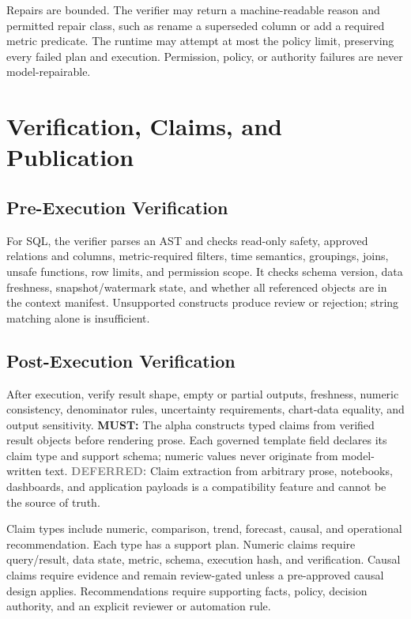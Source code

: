 \documentclass[10pt]{article}
\newcommand{\must}{\textbf{\textcolor{amosblue}{MUST:}}\xspace}
\newcommand{\deferred}{\textbf{\textcolor{gray}{DEFERRED:}}\xspace}
\begin{document}
Repairs are bounded. The verifier may return a machine-readable reason and permitted repair class, such as rename a superseded column or add a required metric predicate. The runtime may attempt at most the policy limit, preserving every failed plan and execution. Permission, policy, or authority failures are never model-repairable.

\section{Verification, Claims, and Publication}

\subsection{Pre-Execution Verification}

For SQL, the verifier parses an AST and checks read-only safety, approved relations and columns, metric-required filters, time semantics, groupings, joins, unsafe functions, row limits, and permission scope. It checks schema version, data freshness, snapshot/watermark state, and whether all referenced objects are in the context manifest. Unsupported constructs produce review or rejection; string matching alone is insufficient.

\subsection{Post-Execution Verification}

After execution, verify result shape, empty or partial outputs, freshness, numeric consistency, denominator rules, uncertainty requirements, chart-data equality, and output sensitivity. \must The alpha constructs typed claims from verified result objects before rendering prose. Each governed template field declares its claim type and support schema; numeric values never originate from model-written text. \deferred Claim extraction from arbitrary prose, notebooks, dashboards, and application payloads is a compatibility feature and cannot be the source of truth.

Claim types include numeric, comparison, trend, forecast, causal, and operational recommendation. Each type has a support plan. Numeric claims require query/result, data state, metric, schema, execution hash, and verification. Causal claims require evidence and remain review-gated unless a pre-approved causal design applies. Recommendations require supporting facts, policy, decision authority, and an explicit reviewer or automation rule.
\end{document}
